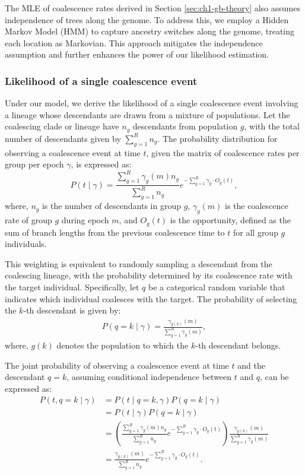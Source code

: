 The MLE of coalescence rates derived in Section \ref{sec:ch1-gb-theory} also assumes independence of trees along the genome. To address this, we employ a Hidden Markov Model (HMM) to capture ancestry switches along the genome, treating each location as Markovian. This approach mitigates the independence assumption and further enhances the power of our likelihood estimation.

\subsubsection{Likelihood of a single coalescence event}
Under our model, we derive the likelihood of a single coalescence event involving a lineage whose descendants are drawn from a mixture of populations. Let the coalescing clade or lineage have $n_g$ descendants from population $g$, with the total number of descendants given by $\sum_{g=1}^R n_g$. The probability distribution for observing a coalescence event at time $t$, given the matrix of coalescence rates per group per epoch $\gamma$, is expressed as:
\begin{equation}
    P(t \mid \gamma) = \frac{\sum_{g=1}^R \gamma_g(m) n_g}{\sum_{g=1}^R n_g} 
    e^{-\sum_{g=1}^R \gamma_g \cdot O_g(t)},
\label{eq:gb_single_coal_like}
\end{equation}
where, $n_g$ is the number of descendants in group $g$, $\gamma_g(m)$ is the coalescence rate of group $g$ during epoch $m$, and $O_g(t)$ is the opportunity, defined as the sum of branch lengths from the previous coalescence time to $t$ for all group $g$ individuals.

This weighting is equivalent to randomly sampling a descendant from the coalescing lineage, with the probability determined by its coalescence rate with the target individual. Specifically, let \( q \) be a categorical random variable that indicates which individual coalesces with the target. The probability of selecting the \( k \)-th descendant is given by:
\begin{align}
    P(q = k \mid \gamma) = \frac{\gamma_{g(k)}(m)}{\sum_{g=1}^R \gamma_g(m)},
\end{align}
where, \( g(k) \) denotes the population to which the \( k \)-th descendant belongs. 

The joint probability of observing a coalescence event at time \( t \) and the descendant \( q = k \), assuming conditional independence between \( t \) and \( q \), can be expressed as:
\begin{align}
    P(t, q = k \mid \gamma) &= P(t \mid q = k, \gamma) P(q = k \mid \gamma) \nonumber \\
    &= P(t \mid \gamma) P(q = k \mid \gamma) \nonumber \\
    &= \left( \frac{\sum_{g=1}^R \gamma_g(m) n_g}{\sum_{g=1}^R n_g} 
    e^{-\sum_{g=1}^R \gamma_g \cdot O_g(t)} \right)
    \frac{\gamma_{g(k)}(m)}{\sum_{g=1}^R \gamma_g(m)} \nonumber \\
    &= \frac{\gamma_{g(k)}(m)}{\sum_{g=1}^R n_g} 
    e^{-\sum_{g=1}^R \gamma_g \cdot O_g(t)}.
\end{align}

